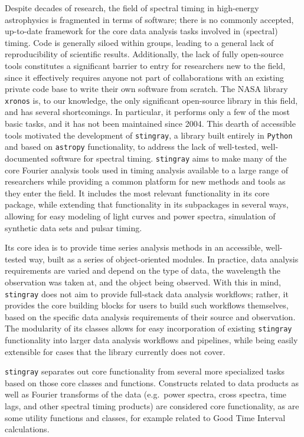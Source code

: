 \documentclass[twocolumn]{aastex62}
\newcommand{\python}{\texttt{Python}\xspace}
\newcommand{\stingray}{\texttt{stingray}\xspace}
\newcommand{\astropy}{\texttt{astropy}\xspace}
\begin{document}
Despite decades of research, the field of spectral timing in high-energy astrophysics is fragmented in terms of software; there is no commonly accepted, up-to-date framework for the core data analysis tasks involved in (spectral) timing. Code is generally siloed within groups, leading to a general lack of reproducibility of scientific results. Additionally, the lack of fully open-source tools constitutes a significant barrier to entry for researchers new to the field, since it effectively requires anyone not part of collaborations with an existing private code base to write their own software from scratch. 
The NASA library \texttt{xronos} is, to our knowledge, the only significant open-source library in this field, and has several shortcomings. 
In particular, it performs only a few of the most basic tasks, and it has not been maintained since 2004. 
This dearth of accessible tools motivated the development of \stingray, a library built entirely in \python and based on \astropy functionality, to address the lack of well-tested, well-documented software for spectral timing. 
\stingray aims to make many of the core Fourier analysis tools used in timing analysis available to a large range of researchers while providing a common platform for new methods and tools as they enter the field. 
It includes the most relevant functionality in its core package, while extending that functionality in its subpackages in several ways, allowing for easy modeling of light curves and power spectra, simulation of synthetic data sets and pulsar timing. 

Its core idea is to provide time series analysis methods in an accessible, well-tested way, built as a series of object-oriented modules. In practice, data analysis requirements are varied and depend on the type of data, the wavelength the observation was taken at, and the object being observed. With this in mind, \stingray does not aim to provide full-stack data analysis workflows; rather, it provides the core building blocks for users to build such workflows themselves, based on the specific data analysis requirements of their source and observation. 
The modularity of its classes allows for easy incorporation of existing \stingray functionality into larger data analysis workflows and pipelines, while being easily extensible for cases that the library currently does not cover. 

\stingray separates out core functionality from several more specialized tasks based on those core classes and functions. Constructs related to data products as well as Fourier transforms of the data (e.g.\ power spectra, cross spectra, time lags, and other spectral timing products) are considered core functionality, as are some utility functions and classes, for example related to Good Time Interval calculations. 
\end{document}
